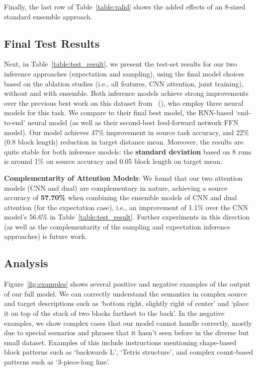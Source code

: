\documentclass[letterpaper]{article} %
\newcommand{\newcite}[1]{\citeauthor{#1} (\citeyear{#1})}
\begin{document}
Finally, the last row of Table~\ref{table:valid} shows the added effects of an 8-sized standard ensemble approach.


\subsection{Final Test Results}
\label{sec:finaltest}
Next, in Table~\ref{table:test_result}, we present the test-set results for our two inference approaches (expectation and sampling), using the final model choices based on the ablation studies (i.e., all features, CNN attention, joint training), without and with ensemble.
Both inference models achieve strong improvements over the previous best work on this dataset from~\newcite{bisk2016natural}, who employ three neural models for this task. We compare to their final best model, the RNN-based `end-to-end' neural model (as well as their second-best feed-forward network FFN model).
Our model achieves 47\% improvement in source task accuracy, and 22\% (0.8 block length) reduction in target distance mean.
Moreover, the results are quite stable for both inference models: the \textbf{standard deviation} based on 8 runs is around 1\% on source accuracy and 0.05 block length on target mean.

\textbf{Complementarity of Attention Models}:
We found that our two attention models (CNN and dual) are complementary in nature, achieving a source accuracy of \textbf{57.70\%} when combining the ensemble models of CNN and dual attention (for the expectation case), i.e., an improvement of 1.1\% over the CNN model's 56.6\% in Table~\ref{table:test_result}.
Further experiments in this direction (as well as the complementarity of the sampling and expectation inference approaches) is future work.



\subsection{Analysis}
Figure~\ref{fig:examples} shows several positive and negative examples of the output of our full model. We can correctly understand the semantics in complex source and target descriptions such as `bottom right, slightly right of center' and `place it on top of the stack of two blocks furthest to the back'. In the negative examples, we show complex cases that our model cannot handle correctly, mostly due to special scenarios and phrases that it hasn't seen before in the diverse but small dataset. Examples of this include instructions mentioning shape-based block patterns such as `backwards L', `Tetris structure', and complex count-based patterns such as `3-piece-long line'.
\end{document}
